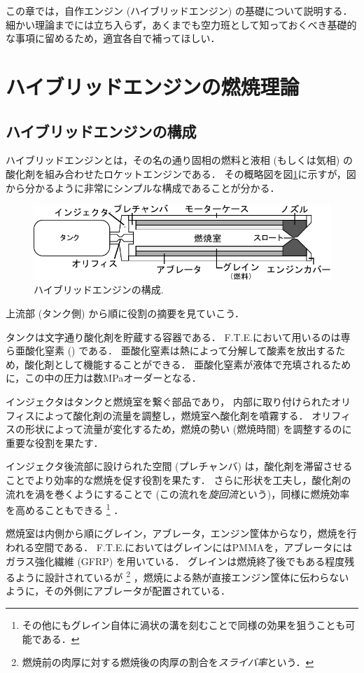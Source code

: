 \documentclass[uplatex,dvipdfmx,a4j,11pt]{jsreport}
\numberwithin{equation}{chapter}
\begin{document}
この章では，自作エンジン (ハイブリッドエンジン) の基礎について説明する．
細かい理論までには立ち入らず，あくまでも空力班として知っておくべき基礎的な事項に留めるため，適宜各自で補ってほしい．
\nocite{rocketPropulsionElements}
\section{ハイブリッドエンジンの燃焼理論}
\subsection{ハイブリッドエンジンの構成}
ハイブリッドエンジンとは，その名の通り固相の燃料と液相 (もしくは気相) の酸化剤を組み合わせたロケットエンジンである．
その概略図を図\ref{fig:hybrid_engine}に示すが，図から分かるように非常にシンプルな構成であることが分かる．
\begin{figure}[H]
  \centering
  \includegraphics{aero/img/engine_structure1.pdf}
  \caption{ハイブリッドエンジンの構成.}
  \label{fig:hybrid_engine}
\end{figure}

上流部 (タンク側) から順に役割の摘要を見ていこう．

タンクは文字通り酸化剤を貯蔵する容器である．
F.T.E.において用いるのは専ら亜酸化窒素 () である．
亜酸化窒素は熱によって分解して酸素を放出するため，酸化剤として機能することができる．
亜酸化窒素が液体で充填されるために，この中の圧力は数\unit{\mega\pascal}オーダーとなる．

インジェクタはタンクと燃焼室を繋ぐ部品であり，
内部に取り付けられたオリフィスによって酸化剤の流量を調整し，燃焼室へ酸化剤を噴霧する．
オリフィスの形状によって流量が変化するため，燃焼の勢い (燃焼時間) を調整するのに重要な役割を果たす．

インジェクタ後流部に設けられた空間 (プレチャンバ) は，酸化剤を滞留させることでより効率的な燃焼を促す役割を果たす．
さらに形状を工夫し，酸化剤の流れを渦を巻くようにすることで (この流れを\emph{旋回流}という)，同様に燃焼効率を高めることもできる
\footnote{その他にもグレイン自体に渦状の溝を刻むことで同様の効果を狙うことも可能である．}
．

燃焼室は内側から順にグレイン，アブレータ，エンジン筐体からなり，燃焼を行われる空間である．
F.T.E.においてはグレインにはPMMAを，アブレータにはガラス強化繊維 (GFRP) を用いている．
グレインは燃焼終了後でもある程度残るように設計されているが
\footnote{燃焼前の肉厚に対する燃焼後の肉厚の割合を\emph{スライバ率}という．}
，燃焼による熱が直接エンジン筐体に伝わらないように，その外側にアブレータが配置されている．
\end{document}
